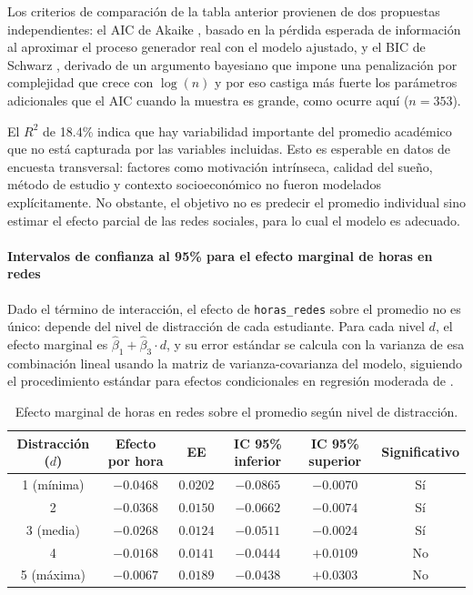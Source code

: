 \documentclass[12pt]{article}
\begin{document}
Los criterios de comparación de la tabla anterior provienen de dos propuestas independientes: el AIC de Akaike \cite{akaike1974}, basado en la pérdida esperada de información al aproximar el proceso generador real con el modelo ajustado, y el BIC de Schwarz \cite{schwarz1978}, derivado de un argumento bayesiano que impone una penalización por complejidad que crece con \(\log(n)\) y por eso castiga más fuerte los parámetros adicionales que el AIC cuando la muestra es grande, como ocurre aquí (\(n=353\)).

El \(R^2\) de 18.4\% indica que hay variabilidad importante del promedio académico que no está capturada por las variables incluidas. Esto es esperable en datos de encuesta transversal: factores como motivación intrínseca, calidad del sueño, método de estudio y contexto socioeconómico no fueron modelados explícitamente. No obstante, el objetivo no es predecir el promedio individual sino estimar el efecto parcial de las redes sociales, para lo cual el modelo es adecuado.

\paragraph{Intervalos de confianza al 95\% para el efecto marginal de horas en redes}

Dado el término de interacción, el efecto de \texttt{horas\_redes} sobre el promedio no es único: depende del nivel de distracción de cada estudiante. Para cada nivel \(d\), el efecto marginal es \(\hat\beta_1 + \hat\beta_3 \cdot d\), y su error estándar se calcula con la varianza de esa combinación lineal usando la matriz de varianza-covarianza del modelo, siguiendo el procedimiento estándar para efectos condicionales en regresión moderada de \cite{aikenwest1991}.

\begin{table}[H]
\centering
\caption{Efecto marginal de horas en redes sobre el promedio según nivel de distracción.}
\begin{tabular}{cccccc}
\toprule
Distracción (\(d\)) & Efecto por hora & EE & IC 95\% inferior & IC 95\% superior & Significativo \\
\midrule
1 (mínima) & \(-0.0468\) & \(0.0202\) & \(-0.0865\) & \(-0.0070\) & Sí \\
2 & \(-0.0368\) & \(0.0150\) & \(-0.0662\) & \(-0.0074\) & Sí \\
3 (media) & \(-0.0268\) & \(0.0124\) & \(-0.0511\) & \(-0.0024\) & Sí \\
4 & \(-0.0168\) & \(0.0141\) & \(-0.0444\) & \(+0.0109\) & No \\
5 (máxima) & \(-0.0067\) & \(0.0189\) & \(-0.0438\) & \(+0.0303\) & No \\
\bottomrule
\end{tabular}
\label{tab:efecto_marginal_detallado}
\end{table}
\end{document}
